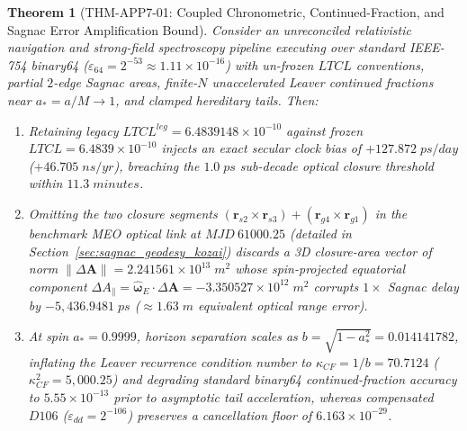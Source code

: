 \documentclass[11pt,a4paper,reqno]{article}
\def\texttt#1{#1}%
\def\mathrm#1{#1}%
\def\mathbb#1{#1}%
\def\Done{D106}%
\def\LTCL{LTCL}%
\theoremstyle{plain}
\newtheorem{theorem}{Theorem}[section]
\theoremstyle{definition}
\theoremstyle{remark}
\numberwithin{equation}{section}
\numberwithin{table}{section}
\newcommand{\Done}{\mathbb{D}_{106}}
\newcommand{\LTCL}{L_{\mathrm{TCL}}}
\begin{document}
\begin{theorem}[{\texttt{THM-APP7-01}: Coupled Chronometric, Continued-Fraction, and Sagnac Error Amplification Bound}]
\label{thm:app7_crisis}
Consider an unreconciled relativistic navigation and strong-field spectroscopy pipeline executing over standard IEEE-754 \texttt{binary64} ($\varepsilon_{64} = 2^{-53} \approx 1.11 \times 10^{-16}$) with un-frozen $\LTCL$ conventions, partial $2$-edge Sagnac areas, finite-$N$ unaccelerated Leaver continued fractions near $a_* = a/M \to 1$, and clamped hereditary tails. Then:
\begin{enumerate}[label=(\roman*), before=\raggedright]
  \item Retaining legacy $\LTCL^{\mathrm{leg}} = 6.4839148 \times 10^{-10}$ against frozen $\LTCL = 6.4839 \times 10^{-10}$ injects an exact secular clock bias of $+127.872\;\mathrm{ps/day}$ ($+46.705\;\mathrm{ns/yr}$), breaching the $1.0\;\mathrm{ps}$ sub-decade optical closure threshold within $11.3\;\mathrm{minutes}$.
  \item Omitting the two closure segments $(\mathbf{r}_{s2}\times\mathbf{r}_{s3}) + (\mathbf{r}_{g4}\times\mathbf{r}_{g1})$ in the benchmark MEO optical link at $\mathrm{MJD}~61000.25$ (detailed in Section~\ref{sec:sagnac_geodesy_kozai}) discards a 3D closure-area vector of norm $\|\Delta\mathbf{A}\| = 2.241561\times 10^{13}\;\mathrm{m}^2$ whose spin-projected equatorial component $\Delta A_\parallel = \hat{\boldsymbol{\omega}}_E\cdot\Delta\mathbf{A} = -3.350527\times 10^{12}\;\mathrm{m}^2$ corrupts $1\times$ Sagnac delay by $-5{,}436.9481\;\mathrm{ps}$ ($\approx 1.63\;\mathrm{m}$ equivalent optical range error).
  \item At spin $a_* = 0.9999$, horizon separation scales as $b = \sqrt{1-a_*^2} = 0.014141782$, inflating the Leaver recurrence condition number to $\kappa_{\mathrm{CF}} = 1/b = 70.7124$ ($\kappa_{\mathrm{CF}}^2 = 5{,}000.25$) and degrading standard \texttt{binary64} continued-fraction accuracy to $5.55 \times 10^{-13}$ prior to asymptotic tail acceleration, whereas compensated $\Done$ ($\varepsilon_{\mathrm{dd}} = 2^{-106}$) preserves a cancellation floor of $6.163 \times 10^{-29}$.
\end{enumerate}
\end{theorem}
\end{document}
